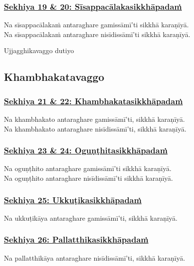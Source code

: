 \subsubsection*{\hyperref[training19-20]{Sekhiya 19 \& 20: Sīsappacālakasikkhāpadaṁ}}
\label{sekh19-20}
Na sīsappacālakaṁ antaraghare gamissāmī'ti sikkhā karaṇīyā.\\
Na sīsappacālakaṁ antaraghare nisīdissāmī'ti sikkhā karaṇīyā.

\begin{center}
  Ujjagghikavaggo dutiyo
\end{center}

\subsection{Khambhakatavaggo}
\vspace{0.2cm}

\subsubsection*{\hyperref[training21-22]{Sekhiya 21 \& 22: Khambhakatasikkhāpadaṁ}}
\label{sekh21-22}
Na khambhakato antaraghare gamissāmī'ti, sikkhā karaṇīyā.\\
Na khambhakato antaraghare nisīdissāmī'ti, sikkhā karaṇīyā.

\subsubsection*{\hyperref[training23-24]{Sekhiya 23 \& 24: Oguṇṭhitasikkhāpadaṁ}}
\label{sekh23-24}
Na oguṇṭhito antaraghare gamissāmī'ti sikkhā karaṇīyā.\\
Na oguṇṭhito antaraghare nisīdissāmī'ti sikkhā karaṇīyā.

\subsubsection*{\hyperref[training25]{Sekhiya 25: Ukkuṭikasikkhāpadaṁ}}
\label{sekh25}
Na ukkuṭikāya antaraghare gamissāmī'ti, sikkhā karaṇīyā.

\subsubsection*{\hyperref[training26]{Sekhiya 26: Pallatthikasikkhāpadaṁ}}
\label{sekh26}
Na pallatthikāya antaraghare nisīdissāmī'ti, sikkhā karaṇīyā.

